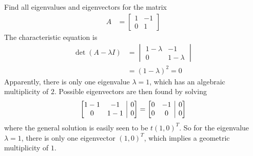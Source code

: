 \begin{exmp}
Find all eigenvalues and eigenvectors for the matrix
\begin{align*}
A &=
\begin{bmatrix}
1 & -1 \\
0 & 1
\end{bmatrix}
\end{align*}
The characteristic equation is
\begin{align*}
\det(A - \lambda I) &= 
\begin{vmatrix}
1-\lambda & -1 \\
0 & 1-\lambda
\end{vmatrix} \\
&= (1-\lambda)^2 = 0
\end{align*}
Apparently, there is only one eigenvalue $\lambda = 1$, which has an algebraic multiplicity of $2$. Possible eigenvectors are then found by solving
\begin{align*}
\left[\begin{array}{@{}cc|c@{}}
1-1 & -1 & 0 \\
0 & 1-1 & 0
\end{array}\right] 
= 
\left[\begin{array}{@{}cc|c@{}}
0 & -1 & 0 \\
0 & 0 & 0
\end{array}\right]
\end{align*}
where the general solution is easily seen to be $t(1,0)^T$. So for the eigenvalue $\lambda = 1$, there is only one eigenvector $(1,0)^T$, which implies a geometric multiplicity of $1$.
\end{exmp}

